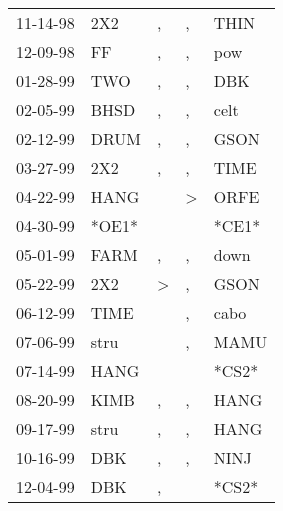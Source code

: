 \begin{supertabular}{p{0.07\textwidth}p{0.06\textwidth}p{0.02\textwidth}p{0.02\textwidth}p{0.06\textwidth}}
 11-14-98\textsuperscript{} &   2X2\textsuperscript{} &             , &             , &  THIN\textsuperscript{} \\
 12-09-98\textsuperscript{} &    FF\textsuperscript{} &             , &             , &   pow\textsuperscript{} \\
 01-28-99\textsuperscript{} &   TWO\textsuperscript{} &             , &             , &   DBK\textsuperscript{} \\
 02-05-99\textsuperscript{} &  BHSD\textsuperscript{} &             , &             , &  celt\textsuperscript{} \\
 02-12-99\textsuperscript{} &  DRUM\textsuperscript{} &             , &             , &  GSON\textsuperscript{} \\
 03-27-99\textsuperscript{} &   2X2\textsuperscript{} &             , &             , &  TIME\textsuperscript{} \\
 04-22-99\textsuperscript{} &  HANG\textsuperscript{} &               &  \textgreater &  ORFE\textsuperscript{} \\
 04-30-99\textsuperscript{} &                   *OE1* &               &               &                   *CE1* \\
 05-01-99\textsuperscript{} &  FARM\textsuperscript{} &             , &             , &  down\textsuperscript{} \\
 05-22-99\textsuperscript{} &   2X2\textsuperscript{} &  \textgreater &             , &  GSON\textsuperscript{} \\
 06-12-99\textsuperscript{} &  TIME\textsuperscript{} &               &             , &  cabo\textsuperscript{} \\
 07-06-99\textsuperscript{} &  stru\textsuperscript{} &               &             , &  MAMU\textsuperscript{} \\
 07-14-99\textsuperscript{} &  HANG\textsuperscript{} &               &               &                   *CS2* \\
 08-20-99\textsuperscript{} &  KIMB\textsuperscript{} &             , &             , &  HANG\textsuperscript{} \\
 09-17-99\textsuperscript{} &  stru\textsuperscript{} &             , &             , &  HANG\textsuperscript{} \\
 10-16-99\textsuperscript{} &   DBK\textsuperscript{} &             , &             , &  NINJ\textsuperscript{} \\
 12-04-99\textsuperscript{} &   DBK\textsuperscript{} &             , &               &                   *CS2* \\

\end{supertabular}
